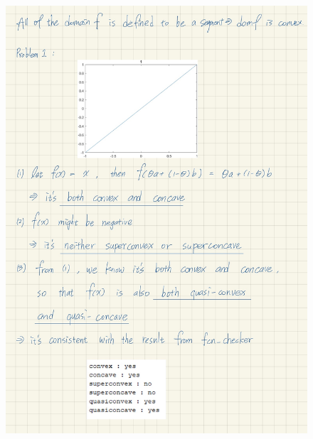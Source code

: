 \documentclass[a4paper, onecolumn, , 11pt]{IEEEtran}
\begin{document}
    \begin{figure}
        \centering
        \includegraphics[width=1\textwidth]{proofs/prob1.jpg}
    \end{figure}
\end{document}
